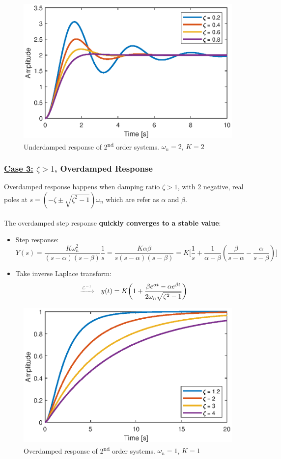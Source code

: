 \begin{figure}[H] 
    \centering 
    \includegraphics[width=.8\textwidth]{images/underdamped_response.eps}
    \caption{Underdamped response of 2\textsuperscript{nd} order systems. $\omega_{n}=2$, $K=2$}
\end{figure}

\subsubsection{\underline{Case 3:} $\zeta>1$, Overdamped Response}
Overdamped response happens when damping ratio $\zeta>1$, with 2 negative, real poles at $s = (-\zeta\pm \sqrt{\zeta^{2}-1})\omega_{n}$ which are refer as $\alpha$ and $\beta$.\\\\
The overdamped step response \textbf{quickly converges to a stable value}:
\begin{itemize}
    \item Step response:
    \[
    Y(s) = \frac{K\omega_{n}^{2}}{(s-\alpha)(s-\beta)} \frac{1}{s} = \frac{K\alpha\beta}{s(s-\alpha)(s-\beta)} = K\bigg[ \frac{1}{s}+\frac{1}{\alpha-\beta}(\frac{\beta}{s-\alpha}-\frac{\alpha}{s-\beta})\bigg]
    \]
    
\item Take inverse Laplace transform:
    \[
    {\color{gray}\xrightarrow{\mathcal{L}^{-1}}} \quad
    y(t) = K\bigg(1+\frac{\beta e^{\alpha t}-\alpha e^{\beta t}}{2\omega_{n}\sqrt{\zeta^{2}-1}}\bigg)
    \]
\end{itemize}

\begin{figure}[H] 
    \centering 
    \includegraphics[width=.8\textwidth]{images/overdamped_response.eps}
    \caption{Overdamped response of 2\textsuperscript{nd} order systems. $\omega_{n}=1$, $K=1$}
\end{figure}

